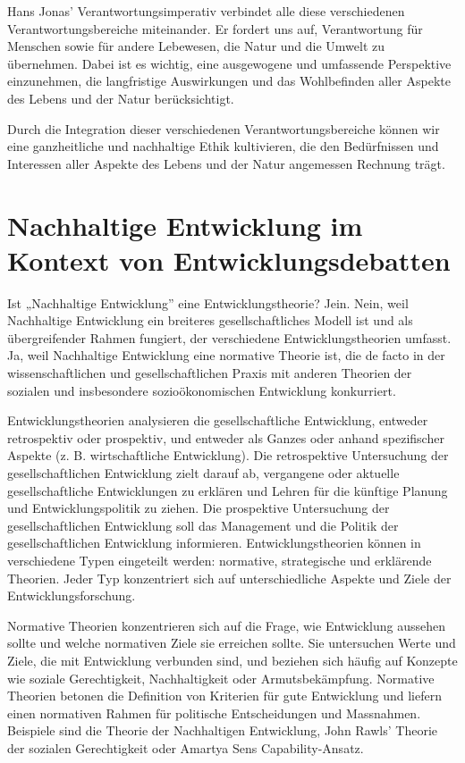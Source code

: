 \documentclass[
  nswissgerman,
  a4paper,
  DIV=11,
  numbers=noendperiod,
  oneside,
  openany]{scrreprt}
\begin{document}
Hans Jonas' Verantwortungsimperativ verbindet alle diese verschiedenen
Verantwortungsbereiche miteinander. Er fordert uns auf, Verantwortung
für Menschen sowie für andere Lebewesen, die Natur und die Umwelt zu
übernehmen. Dabei ist es wichtig, eine ausgewogene und umfassende
Perspektive einzunehmen, die langfristige Auswirkungen und das
Wohlbefinden aller Aspekte des Lebens und der Natur berücksichtigt.

Durch die Integration dieser verschiedenen Verantwortungsbereiche können
wir eine ganzheitliche und nachhaltige Ethik kultivieren, die den
Bedürfnissen und Interessen aller Aspekte des Lebens und der Natur
angemessen Rechnung trägt.

\section{Nachhaltige Entwicklung im Kontext von
Entwicklungsdebatten}\label{nachhaltige-entwicklung-im-kontext-von-entwicklungsdebatten}

Ist „Nachhaltige Entwicklung'' eine Entwicklungstheorie? Jein. Nein,
weil Nachhaltige Entwicklung ein breiteres gesellschaftliches Modell ist
und als übergreifender Rahmen fungiert, der verschiedene
Entwicklungstheorien umfasst. Ja, weil Nachhaltige Entwicklung eine
normative Theorie ist, die de facto in der wissenschaftlichen und
gesellschaftlichen Praxis mit anderen Theorien der sozialen und
insbesondere sozioökonomischen Entwicklung konkurriert.

Entwicklungstheorien analysieren die gesellschaftliche Entwicklung,
entweder retrospektiv oder prospektiv, und entweder als Ganzes oder
anhand spezifischer Aspekte (z. B. wirtschaftliche Entwicklung). Die
retrospektive Untersuchung der gesellschaftlichen Entwicklung zielt
darauf ab, vergangene oder aktuelle gesellschaftliche Entwicklungen zu
erklären und Lehren für die künftige Planung und Entwicklungspolitik zu
ziehen. Die prospektive Untersuchung der gesellschaftlichen Entwicklung
soll das Management und die Politik der gesellschaftlichen Entwicklung
informieren. Entwicklungstheorien können in verschiedene Typen
eingeteilt werden: normative, strategische und erklärende Theorien.
Jeder Typ konzentriert sich auf unterschiedliche Aspekte und Ziele der
Entwicklungsforschung.

Normative Theorien konzentrieren sich auf die Frage, wie Entwicklung
aussehen sollte und welche normativen Ziele sie erreichen sollte. Sie
untersuchen Werte und Ziele, die mit Entwicklung verbunden sind, und
beziehen sich häufig auf Konzepte wie soziale Gerechtigkeit,
Nachhaltigkeit oder Armutsbekämpfung. Normative Theorien betonen die
Definition von Kriterien für gute Entwicklung und liefern einen
normativen Rahmen für politische Entscheidungen und Massnahmen.
Beispiele sind die Theorie der Nachhaltigen Entwicklung, John Rawls'
Theorie der sozialen Gerechtigkeit oder Amartya Sens Capability-Ansatz.
\end{document}
